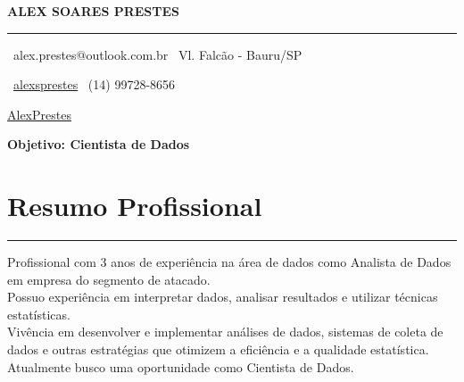 \documentclass[10pt]{article}
\begin{document}

{\large\bf ALEX SOARES PRESTES \hfill} %
 
\vspace{-5pt}
\rule{\linewidth}{1pt}

{\faEnvelope \ alex.prestes@outlook.com.br \hfill \faHome \ Vl. Falcão - Bauru/SP}

{\faLinkedinSquare \ \href{https://www.linkedin.com/in/alexsprestes/}{alexsprestes} \hfill \faWhatsapp \ (14) 99728-8656 }

{\faGithub \href{https://github.com/AlexPrestes/}{AlexPrestes} \hfill }



\vspace{5pt}
\centerline{\large\bf Objetivo: Cientista de Dados}

 
\section*{Resumo Profissional}
\vspace{-15pt}
\rule{\linewidth}{1pt}

Profissional com 3 anos de experiência na área de dados como Analista de Dados em empresa do segmento de atacado.
\\

Possuo experiência em interpretar dados, analisar resultados e utilizar técnicas estatísticas.
\\

Vivência em desenvolver e implementar análises de dados, sistemas de coleta de dados e outras estratégias que otimizem a eficiência e a qualidade estatística.
\\

Atualmente busco uma oportunidade como Cientista de Dados.
\\
\end{document}
